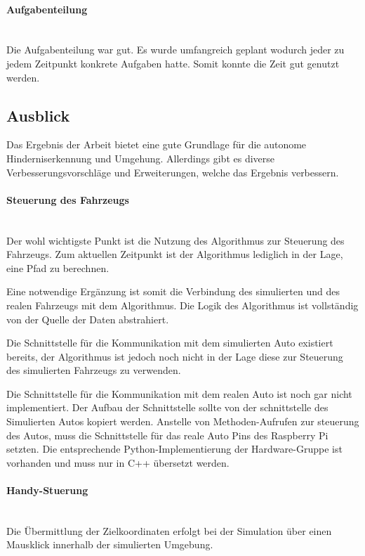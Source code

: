 \paragraph{Aufgabenteilung} \mbox{}\\
Die Aufgabenteilung war gut.
Es wurde umfangreich geplant wodurch jeder zu jedem Zeitpunkt konkrete Aufgaben hatte.
Somit konnte die Zeit gut genutzt werden.

\subsection{Ausblick}
Das Ergebnis der Arbeit bietet eine gute Grundlage für die autonome Hinderniserkennung und Umgehung.
Allerdings gibt es diverse Verbesserungsvorschläge und Erweiterungen, welche das Ergebnis verbessern.

\paragraph{Steuerung des Fahrzeugs} \mbox{}\\
Der wohl wichtigste Punkt ist die Nutzung des Algorithmus zur Steuerung des Fahrzeugs.
Zum aktuellen Zeitpunkt ist der Algorithmus lediglich in der Lage, eine Pfad zu berechnen.

Eine notwendige Ergänzung ist somit die Verbindung des simulierten und des realen Fahrzeugs mit dem Algorithmus.
Die Logik des Algorithmus ist vollständig von der Quelle der Daten abstrahiert.

Die Schnittstelle für die Kommunikation mit dem simulierten Auto existiert bereits,
der Algorithmus ist jedoch noch nicht in der Lage diese zur Steuerung des simulierten Fahrzeugs zu verwenden.

Die Schnittstelle für die Kommunikation mit dem realen Auto ist noch gar nicht implementiert.
Der Aufbau der Schnittstelle sollte von der schnittstelle des Simulierten Autos kopiert werden.
Anstelle von Methoden-Aufrufen zur steuerung des Autos, muss die Schnittstelle für das reale Auto Pins des Raspberry Pi setzten.
Die entsprechende Python-Implementierung der Hardware-Gruppe ist vorhanden und muss nur in C++ übersetzt werden.

\paragraph{Handy-Stuerung} \mbox{}\\
Die Übermittlung der Zielkoordinaten erfolgt bei der Simulation über einen Mausklick innerhalb der simulierten Umgebung.

